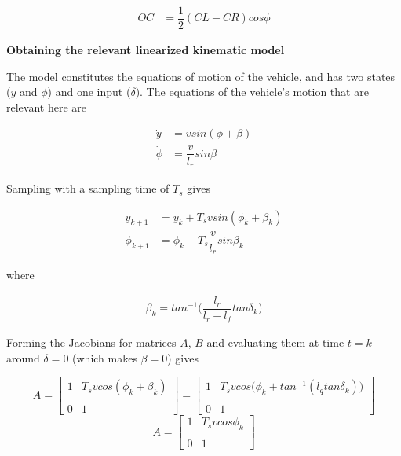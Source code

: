 \begin{align}
  OC &= \dfrac{1}{2}(CL - CR) cos\phi
\end{align}




\textbf{Obtaining the relevant linearized kinematic model}

The model constitutes the equations of motion of the vehicle, and has two
states ($y$ and $\phi$) and one input ($\delta$). The equations of the
vehicle's motion that are relevant here are

\begin{align}
  \dot{y} &= v sin(\phi + \beta) \\
  \dot{\phi} &= \dfrac{v}{l_r} sin\beta
\end{align}

Sampling with a sampling time of $T_s$ gives

\begin{align}
  y_{k+1} &= y_{k} + T_s v sin(\phi_k + \beta_k) \\
  \phi_{k+1} &= \phi_{k} + T_s \dfrac{v}{l_r} sin\beta_k
\end{align}

where

\begin{align}
  \beta_k = tan^{-1}\Big(\dfrac{l_r}{l_r + l_f} tan\delta_k\Big)
\end{align}


Forming the Jacobians for matrices $A$, $B$ and evaluating them at time
$t=k$ around $\delta = 0$ (which makes $\beta = 0$) gives

\begin{equation}
 A =
  \begin{bmatrix}
    1 & T_s v cos(\phi_k + \beta_k) \\\\
    0 & 1
  \end{bmatrix}
  =
  \begin{bmatrix}
    1 & T_s v cos\Big(\phi_k + tan^{-1} (l_q tan\delta_k)\Big) \\\\
    0 & 1
  \end{bmatrix}
\end{equation}
\begin{equation}
 A =
  \begin{bmatrix}
    1 & T_s v cos\phi_k \\\\
    0 & 1
  \end{bmatrix}
\end{equation}

